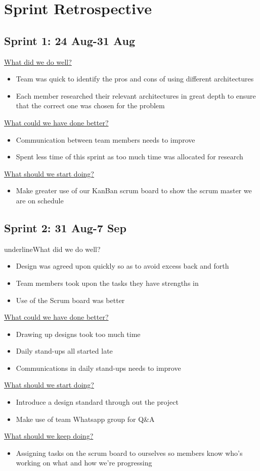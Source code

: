 \documentclass[12pt]{article}
\begin{document}
\section{Sprint Retrospective}
\subsection{Sprint 1: 24 Aug-31 Aug}
\underline{What did we do well?}
\begin{itemize}
\item Team was quick to identify the pros and cons of using different architectures
\item Each member researched their relevant architectures in great depth to ensure that the correct one was chosen for the problem 
\end{itemize}
\underline{What could we have done better?}
\begin{itemize}
\item Communication between team members needs to improve 
\item Spent less time of this sprint as too much time was allocated for research 
\end{itemize}
\underline{What should we start doing?}
\begin{itemize}
\item Make greater use of our KanBan scrum board to show the scrum master we are on schedule
\end{itemize}

\subsection{Sprint 2: 31 Aug-7 Sep}
underline{What did we do well?}
\begin{itemize}
\item Design was agreed upon quickly so as to avoid excess back and forth
\item Team members took upon the tasks they have strengths in
\item Use of the Scrum board was better
\end{itemize}
\underline{What could we have done better?}
\begin{itemize}
\item Drawing up designs took too much time
\item Daily stand-ups all started late
\item Communications in daily stand-ups needs to improve
\end{itemize}
\underline{What should we start doing?}
\begin{itemize}
\item Introduce a design standard through out the project
\item Make use of team Whatsapp group for Q\&A
\end{itemize}
\underline{What should we keep doing?}
\begin{itemize}
\item Assigning tasks on the scrum board to ourselves so members know who's working on what and how we're progressing 
\end{itemize}
\end{document}
